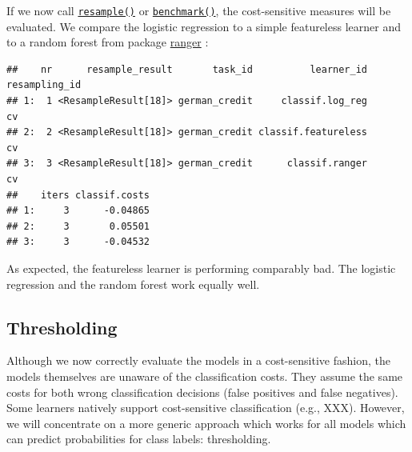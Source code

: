 \documentclass[]{scrbook}
\newenvironment{Shaded}{\begin{snugshade}}{\end{snugshade}}
\newcommand{\DataTypeTok}[1]{\textcolor[rgb]{0.13,0.29,0.53}{#1}}
\newcommand{\DecValTok}[1]{\textcolor[rgb]{0.00,0.00,0.81}{#1}}
\newcommand{\KeywordTok}[1]{\textcolor[rgb]{0.13,0.29,0.53}{\textbf{#1}}}
\newcommand{\NormalTok}[1]{#1}
\newcommand{\OperatorTok}[1]{\textcolor[rgb]{0.81,0.36,0.00}{\textbf{#1}}}
\newcommand{\StringTok}[1]{\textcolor[rgb]{0.31,0.60,0.02}{#1}}
\renewenvironment{Shaded} {\begin{snugshade}\small} {\end{snugshade}}
\begin{document}
If we now call \href{https://mlr3.mlr-org.com/reference/resample.html}{\texttt{resample()}} or \href{https://mlr3.mlr-org.com/reference/benchmark.html}{\texttt{benchmark()}}, the cost-sensitive measures will be evaluated.
We compare the logistic regression to a simple featureless learner and to a random forest from package \href{https://cran.r-project.org/package=ranger}{ranger} :

\begin{Shaded}
\end{Shaded}

\begin{verbatim}
##    nr      resample_result       task_id          learner_id resampling_id
## 1:  1 <ResampleResult[18]> german_credit     classif.log_reg            cv
## 2:  2 <ResampleResult[18]> german_credit classif.featureless            cv
## 3:  3 <ResampleResult[18]> german_credit      classif.ranger            cv
##    iters classif.costs
## 1:     3      -0.04865
## 2:     3       0.05501
## 3:     3      -0.04532
\end{verbatim}

As expected, the featureless learner is performing comparably bad.
The logistic regression and the random forest work equally well.

\hypertarget{thresholding}{%
\subsection{Thresholding}\label{thresholding}}

Although we now correctly evaluate the models in a cost-sensitive fashion, the models themselves are unaware of the classification costs.
They assume the same costs for both wrong classification decisions (false positives and false negatives).
Some learners natively support cost-sensitive classification (e.g., XXX).
However, we will concentrate on a more generic approach which works for all models which can predict probabilities for class labels: thresholding.
\end{document}
